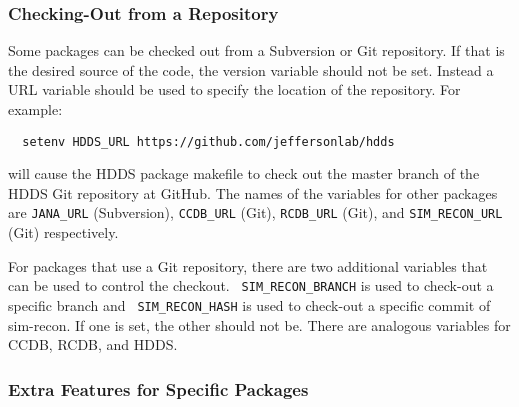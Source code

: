 \documentclass[12pt, letterpaper]{article}
\begin{document}
\subsubsection{Checking-Out from a Repository}

Some packages can be checked out from a Subversion or Git
repository. If that is the desired source of the code, the version
variable should not be set. Instead a URL variable should be used to
specify the location of the repository. For example:

\begin{verbatim}
  setenv HDDS_URL https://github.com/jeffersonlab/hdds
\end{verbatim}

will cause the HDDS package makefile to check out the master branch of
the HDDS Git repository at GitHub. The names of the variables for
other packages are {\tt JANA\_URL} (Subversion), {\tt CCDB\_URL}
(Git), {\tt RCDB\_URL} (Git), and {\tt SIM\_RECON\_URL} (Git)
respectively.

For packages that use a Git repository, there are two additional
variables that can be used to control the checkout. {\tt
  SIM\_RECON\_BRANCH} is used to check-out a specific branch and {\tt
  SIM\_RECON\_HASH} is used to check-out a specific commit of
sim-recon. If one is set, the other should not be. There are analogous
variables for CCDB, RCDB, and HDDS.

\subsubsection{Extra Features for Specific Packages}\label{section:makefile-extras}
\end{document}
